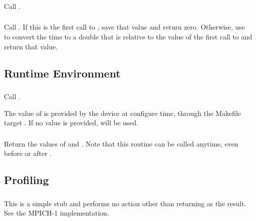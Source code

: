 \documentclass{article}
\begin{document}

\subsubsection{}
Call .

\subsubsection{}
Call .  If this is the first call to
, save that value and return zero.  Otherwise, use
 to convert the time to a double that is
relative to the value of the first call to  and
return that value.   


\subsection{Runtime Environment}
\label{sec:runtime-env}
\subsubsection{}
Call .  

The value of  is provided by the
device at configure time, through the Makefile target
.  If no value is provided,  will be used.

\subsubsection{}
Return the values of  and . 
Note that this routine can be called anytime, even before  or
after .

\subsection{Profiling}
\label{sec:profile}

\subsubsection{}
This is a simple stub and performs no action other than returning
 as the result.  See the MPICH-1 implementation.
\end{document}
